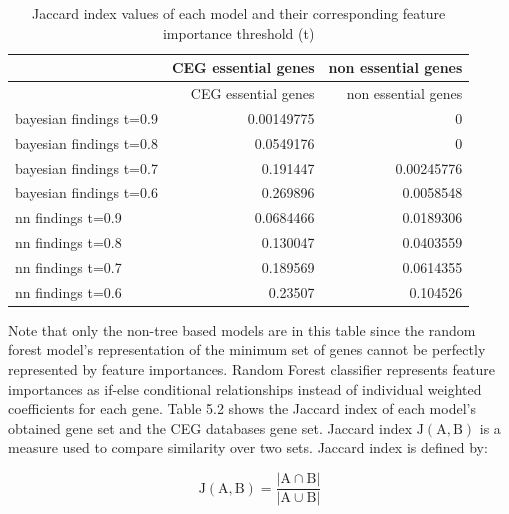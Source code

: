 \documentclass[]{report}
\begin{document}
\begin{longtable}[]{@{}lrr@{}}
\caption{Jaccard index values of each model and their corresponding
feature importance threshold (t)}\tabularnewline
\toprule
\begin{minipage}[b]{0.32\columnwidth}\raggedright\strut
\strut
\end{minipage} & \begin{minipage}[b]{0.32\columnwidth}\raggedleft\strut
CEG essential genes\strut
\end{minipage} & \begin{minipage}[b]{0.32\columnwidth}\raggedleft\strut
non essential genes\strut
\end{minipage}\tabularnewline
\midrule
\endfirsthead
\toprule
\begin{minipage}[b]{0.32\columnwidth}\raggedright\strut
\strut
\end{minipage} & \begin{minipage}[b]{0.32\columnwidth}\raggedleft\strut
CEG essential genes\strut
\end{minipage} & \begin{minipage}[b]{0.32\columnwidth}\raggedleft\strut
non essential genes\strut
\end{minipage}\tabularnewline
\midrule
\endhead
bayesian findings t=0.9 & 0.00149775 & 0\tabularnewline
bayesian findings t=0.8 & 0.0549176 & 0\tabularnewline
bayesian findings t=0.7 & 0.191447 & 0.00245776\tabularnewline
bayesian findings t=0.6 & 0.269896 & 0.0058548\tabularnewline
nn findings t=0.9 & 0.0684466 & 0.0189306\tabularnewline
nn findings t=0.8 & 0.130047 & 0.0403559\tabularnewline
nn findings t=0.7 & 0.189569 & 0.0614355\tabularnewline
nn findings t=0.6 & 0.23507 & 0.104526\tabularnewline
\bottomrule
\end{longtable}

Note that only the non-tree based models are in this table since the
random forest model's representation of the minimum set of genes cannot
be perfectly represented by feature importances. Random Forest
classifier represents feature importances as if-else conditional
relationships instead of individual weighted coefficients for each gene.
Table 5.2 shows the Jaccard index of each model's obtained gene set and
the CEG databases gene set. Jaccard index \(\mathrm{J(A,B)}\) is a
measure used to compare similarity over two sets. Jaccard index is
defined by:

\begin{equation} \mathrm{J(A,B)}=\frac{|\mathrm{A} \cap \mathrm{B}|}{|\mathrm{A} \cup \mathrm{B}|}  \end{equation}
\end{document}
